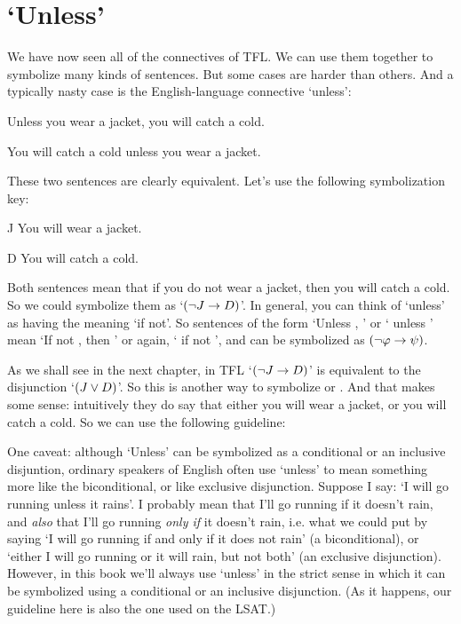 \section{`Unless'}
We have now seen all of the connectives of TFL. We can use them together to symbolize many kinds of sentences. But some cases are harder than others. And a typically nasty case is the English-language connective `unless':
\begin{earg}
\item[\ex{unless1}] Unless you wear a jacket, you will catch a cold.
\item[\ex{unless2}] You will catch a cold unless you wear a jacket.
\end{earg}
These two sentences are clearly equivalent. Let's use the following symbolization key:
	\begin{ekey}
		\item[J] You will wear a jacket.
		\item[D] You will catch a cold.
	\end{ekey}
Both sentences mean that if you do not wear a jacket, then you will catch a cold. So we could symbolize them as `$(\neg J \rightarrow D)$'.   In general, you can think of `unless' as having the meaning `if not'.  So sentences of the form `Unless \meta{\varphi}, \meta{\psi}' or `\meta{\psi} unless \meta{\varphi}' mean `If not \meta{\varphi}, then \meta{\psi}' or again, `\meta{\psi} if not \meta{\varphi}', and can be symbolized as $(\neg \mathcal{\varphi} \rightarrow \mathcal{\psi})$.


As we shall see in the next chapter, in TFL `$(\neg J \rightarrow D)$' is equivalent to the disjunction `$(J \vee D)$'.  So this is another way to symbolize  or .  And that makes some sense: intuitively they do say that either you will wear a jacket, or you will catch a cold.  So we can use the following guideline:

One caveat: although `Unless' can be symbolized as a conditional or an inclusive disjuntion, ordinary speakers of English often use `unless' to mean something more like the biconditional, or like exclusive disjunction. Suppose I say: `I will go running unless it rains'. I probably mean that I'll go running if it doesn't rain, and \emph{also} that I'll go running \emph{only if} it doesn't rain, i.e.  what we could put by saying `I will go running if and only if it does not rain' (a biconditional), or  `either I will go running or it will rain, but not both' (an exclusive disjunction). However, in this book we'll always use `unless' in the strict sense in which it can be symbolized using a conditional or an inclusive disjunction.  (As it happens, our guideline here is also the one used on the LSAT.)

